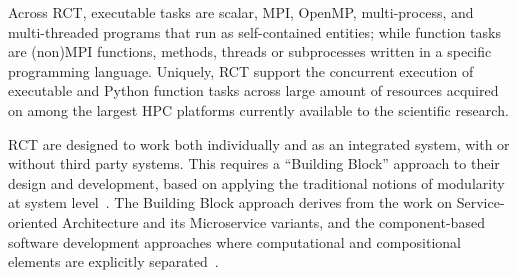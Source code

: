 \documentclass[preprint,12pt, a4paper]{elsarticle}
\begin{document}
Across RCT, executable tasks are scalar, MPI, OpenMP, multi-process, and
multi-threaded programs that run as self-contained entities; while function
tasks are (non)MPI functions, methods, threads or subprocesses written in a
specific programming language. Uniquely, RCT support the concurrent execution of
executable and Python function tasks across large amount of resources acquired
on among the largest HPC platforms currently available to the scientific
research.




RCT are designed to work both individually and as an integrated system, with or
without third party systems. This requires a ``Building Block'' approach to
their design and development, based on applying the traditional notions of
modularity at system level~\cite{turilli2019middleware}. The Building Block
approach derives from the work on Service-oriented Architecture and its
Microservice variants, and the component-based software development approaches
where computational and compositional elements are explicitly
separated~\cite{garlan1995architectural,clemens1998component,schneider2000components}.


\end{document}

